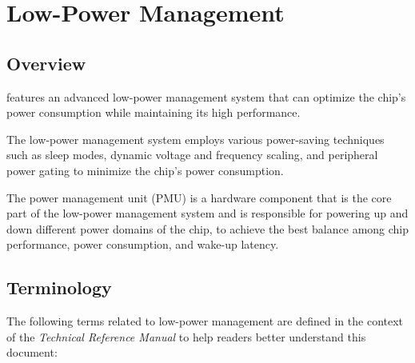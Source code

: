 \documentclass[main\_\_EN.tex]{subfiles}
\begin{document}

\ifglobal
\else
    {\let\clearpage\relax \listoftodos}
    {\let\clearpage\relax \listofdonetodos}
    \tableofcontents
\fi



\hypertarget{lowpowm}{}
\chapter{Low-Power Management}\label{mod:lowpowm}


\section{Overview}

\chipname{} features an advanced low-power management system that can optimize the chip's power consumption while maintaining its high performance.

The low-power management system employs various power-saving techniques such as sleep modes, dynamic voltage and frequency scaling, and peripheral power gating to minimize the chip's power consumption.

The power management unit (PMU) is a hardware component that is the core part of the low-power management system and is responsible for powering up and down different power domains of the chip, to achieve the best balance among chip performance, power consumption, and wake-up latency.

\section{Terminology}

The following terms related to low-power management are defined in the context of the \textit{\chipname{} Technical Reference Manual}
to help readers better understand this document:
\end{document}

